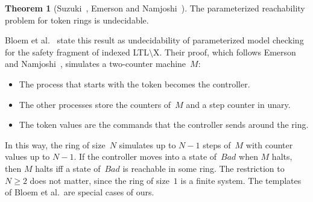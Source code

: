 \documentclass[11pt]{article}
\theoremstyle{definition}
\newtheorem{theorem}{Theorem}
\begin{document}
\begin{theorem}[Suzuki~\cite{Suzuki1988}, Emerson and
  Namjoshi~\cite{EmersonNamjoshi1995,EmersonNamjoshi2003}]\label{thm:rings}
  The parameterized reachability problem for token rings is undecidable.
\end{theorem}

Bloem et al.~\cite[Thm.~4.12]{BloemEtAl2015} state this result as
undecidability of parameterized model checking for the safety fragment of
indexed LTL$\setminus$X. Their proof, which follows Emerson and
Namjoshi~\cite[Sec.~6]{EmersonNamjoshi2003}, simulates a two-counter
machine~$M$:
\begin{itemize}
  \item The process that starts with the token becomes the controller.
  \item The other processes store the counters of~$M$ and a step counter in
    unary.
  \item The token values are the commands that the controller sends around
    the ring.
\end{itemize}
In this way, the ring of size~$N$ simulates up to $N - 1$ steps of~$M$ with
counter values up to $N - 1$. If the controller moves into a state
of~$\mathit{Bad}$ when $M$ halts, then $M$ halts iff a state of~$\mathit{Bad}$ is
reachable in some ring. The restriction to $N \ge 2$ does not matter, since
the ring of size~$1$ is a finite system. The templates of Bloem et al.\ are
special cases of ours.
\end{document}
